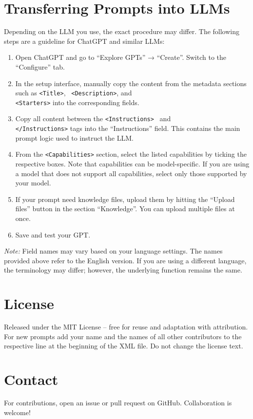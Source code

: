 \documentclass[a4paper,11pt]{refart}
\begin{document}
\section{Transferring Prompts into LLMs}
Depending on the LLM you use, the exact procedure may differ. The following steps are a guideline for ChatGPT and similar LLMs:
\begin{enumerate}
  \item Open ChatGPT and go to ``Explore GPTs'' → ``Create''. Switch to the ``Configure'' tab.
  \item In the setup interface, manually copy the content from the metadata sections such as \lstinline!<Title>!, \  \lstinline!<Description>!, and \\ \lstinline!<Starters>! into the corresponding fields.
  \item Copy all content between the \lstinline!<Instructions>! \ and \\ \lstinline!</Instructions>! tags into the ``Instructions'' field. This contains the main prompt logic used to instruct the LLM.
  \item From the \lstinline!<Capabilities>! section, select the listed capabilities by ticking the respective boxes. Note that capabilities can be model-specific. If you are using a model that does not support all capabilities, select only those supported by your model.
  \item If your prompt need knowledge files, upload them by hitting the ``Upload files'' button in the section ``Knowledge''. You can upload multiple files at once.
  \item Save and test your GPT.
\end{enumerate}
\textit{Note:} Field names may vary based on your language settings. The names provided above refer to the English version. If you are using a different language, the terminology may differ; however, the underlying function remains the same.

\section{License}
Released under the MIT License -- free for reuse and adaptation with attribution. For new prompts add your name and the names of all other contributors to the respective line at the beginning of the XML file. Do not change the license text.

\section{Contact}
For contributions, open an issue or pull request on GitHub. Collaboration is welcome!

%
%
\printbibliography[heading=bibintoc]
\end{document}
